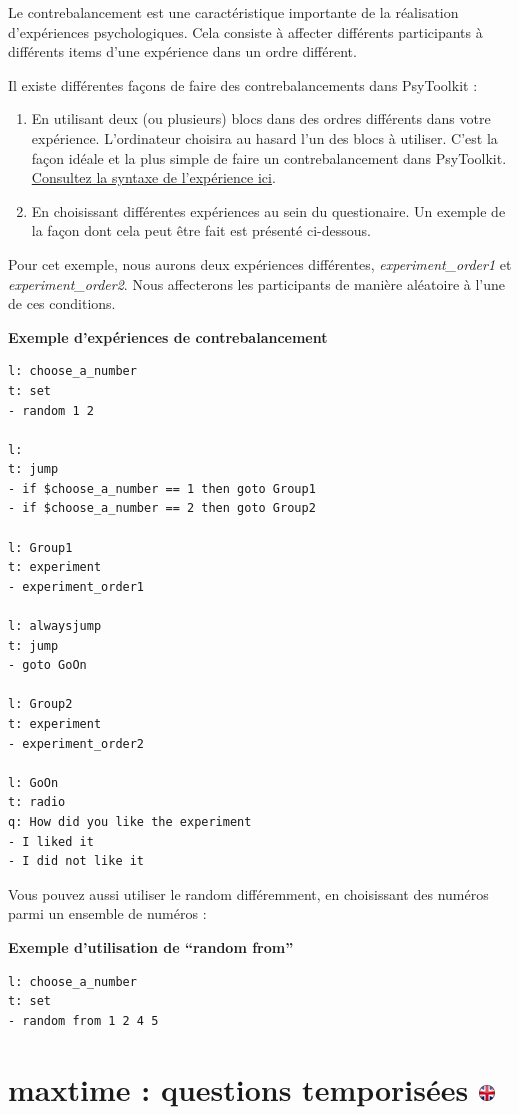 \documentclass[
]{book}
\providecommand{\tightlist}{%
  \setlength{\itemsep}{0pt}\setlength{\parskip}{0pt}}
\begin{document}
Le contrebalancement est une caractéristique importante de la réalisation d'expériences psychologiques. Cela consiste à affecter différents participants à différents items d'une expérience dans un ordre différent.

Il existe différentes façons de faire des contrebalancements dans PsyToolkit :

\begin{enumerate}
\def\labelenumi{\arabic{enumi}.}
\tightlist
\item
  En utilisant deux (ou plusieurs) blocs dans des ordres différents dans votre expérience. L'ordinateur choisira au hasard l'un des blocs à utiliser. C'est la façon idéale et la plus simple de faire un contrebalancement dans PsyToolkit. \protect\hyperlink{blockorder}{Consultez la syntaxe de l'expérience ici}.
\item
  En choisissant différentes expériences au sein du questionaire. Un exemple de la façon dont cela peut être fait est présenté ci-dessous.
\end{enumerate}

Pour cet exemple, nous aurons deux expériences différentes, \emph{experiment\_order1} et \emph{experiment\_order2}. Nous affecterons les participants de manière aléatoire à l'une de ces conditions.

\textbf{Exemple d'expériences de contrebalancement}

\begin{verbatim}
l: choose_a_number
t: set
- random 1 2

l:
t: jump
- if $choose_a_number == 1 then goto Group1
- if $choose_a_number == 2 then goto Group2

l: Group1
t: experiment
- experiment_order1

l: alwaysjump
t: jump
- goto GoOn

l: Group2
t: experiment
- experiment_order2

l: GoOn
t: radio
q: How did you like the experiment
- I liked it
- I did not like it
\end{verbatim}

Vous pouvez aussi utiliser le random différemment, en choisissant des numéros parmi un ensemble de numéros :

\textbf{Exemple d'utilisation de ``random from''}

\begin{verbatim}
l: choose_a_number
t: set
- random from 1 2 4 5
\end{verbatim}

\hypertarget{maxtime-questions-temporisuxe9es}{%
\section[maxtime : questions temporisées ]{\texorpdfstring{maxtime : questions temporisées \href{https://www.psytoolkit.org/doc3.4.0/online-survey-syntax.html\#maxtime}{\protect\includegraphics{img/ukflag.png}}}{maxtime : questions temporisées }}\label{maxtime-questions-temporisuxe9es}}
\end{document}
